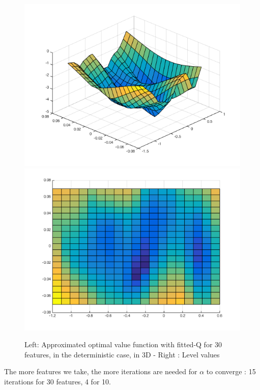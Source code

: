 \documentclass[a4paper, 12pt]{article}
\begin{document}
\begin{figure}[H]
	\centering
	\noindent\includegraphics[scale=0.3]{fittedQ-30feat-determ.png}
	\noindent\includegraphics[scale=0.3]{fittedQ-30feat-determ-flat.png}
	\caption{Left: Approximated optimal value function with fitted-Q for 30 features, in the deterministic case, in 3D - Right : Level values}
\end{figure}
The more features we take, the more iterations are needed for $\alpha$ to converge : 15 iterations for 30 features, 4 for 10.
\end{document}
